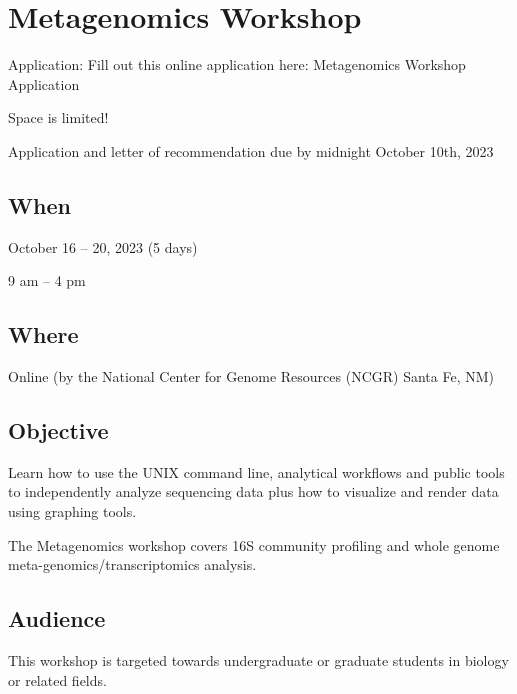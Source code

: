 \documentclass[
]{book}
\begin{document}
\hypertarget{metagenomics-workshop}{%
\chapter*{Metagenomics Workshop}\label{metagenomics-workshop}}

Application: Fill out this online application here: Metagenomics Workshop Application

Space is limited!

Application and letter of recommendation due by midnight October 10th, 2023

\hypertarget{when-3}{%
\section*{When}\label{when-3}}

October 16 -- 20, 2023 (5 days)

9 am -- 4 pm

\hypertarget{where-2}{%
\section*{Where}\label{where-2}}

Online (by the National Center for Genome Resources (NCGR) Santa Fe, NM)

\hypertarget{objective-2}{%
\section*{Objective}\label{objective-2}}

Learn how to use the UNIX command line, analytical workflows and public tools to independently analyze sequencing data plus how to visualize and render data using graphing tools.

The Metagenomics workshop covers 16S community profiling and whole genome meta-genomics/transcriptomics analysis.

\hypertarget{audience-2}{%
\section*{Audience}\label{audience-2}}

This workshop is targeted towards undergraduate or graduate students in biology or related fields.
\end{document}
